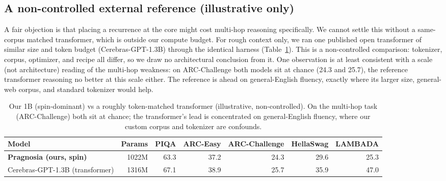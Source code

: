 \documentclass[10pt,twocolumn]{article}
\begin{document}
\subsection{A non-controlled external reference (illustrative only)}
A fair objection is that placing a recurrence at the core might cost multi-hop reasoning specifically. We cannot settle this without a same-corpus matched transformer, which is outside our compute budget. For rough context only, we ran one published open transformer of similar size and token budget (Cerebras-GPT-1.3B) through the identical harness (Table~\ref{tab:cerebras}). This is a non-controlled comparison: tokenizer, corpus, optimizer, and recipe all differ, so we draw no architectural conclusion from it. One observation is at least consistent with a scale (not architecture) reading of the multi-hop weakness: on ARC-Challenge both models sit at chance (24.3 and 25.7), the reference transformer reasoning no better at this scale either. The reference is ahead on general-English fluency, exactly where its larger size, general-web corpus, and standard tokenizer would help.

\begin{table}[t]\centering\small\caption{Our 1B (spin-dominant) vs a roughly token-matched transformer (illustrative, non-controlled). On the multi-hop task (ARC-Challenge) both sit at chance; the transformer's lead is concentrated on general-English fluency, where our custom corpus and tokenizer are confounds.}
\label{tab:cerebras}
\begin{tabular}{@{}l r r r r r r@{}}
\toprule
Model & Params & PIQA & ARC-Easy & ARC-Challenge & HellaSwag & LAMBADA \\
\midrule
\textbf{Pragnosia (ours, spin)} & 1022M & 63.3 & 37.2 & 24.3 & 29.6 & 25.3 \\
Cerebras-GPT-1.3B (transformer) & 1316M & 67.1 & 38.9 & 25.7 & 35.9 & 47.0 \\
\bottomrule
\end{tabular}
\end{table}
\end{document}
